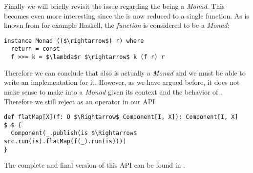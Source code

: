 Finally we will briefly revisit the issue regarding the \comp being a \textit{Monad}. This becomes even more interesting since the \comp is now reduced to a single function. As is known from for example Haskell, the \textit{function} is considered to be a \textit{Monad}:

\begin{lstlisting}[style=InlineHaskellStyle]
instance Monad (($\rightarrow$) r) where
  return = const
  f >>= k = $\lambda$r $\rightarrow$ k (f r) r
\end{lstlisting}

Therefore we can conclude that also \comp is actually a \textit{Monad} and we must be able to write an implementation for it. However, as we have argued before, it does not make sense to make \comp into a \textit{Monad} given its context and the behavior of . Therefore we still reject  as an operator in our API.

\begin{lstlisting}[style=InlineScalaStyle]
def flatMap[X](f: O $\Rightarrow$ Component[I, X]): Component[I, X] $=$ {
  Component(_.publish(is $\Rightarrow$ src.run(is).flatMap(f(_).run(is))))
}
\end{lstlisting}

The complete and final version of this API can be found in .
